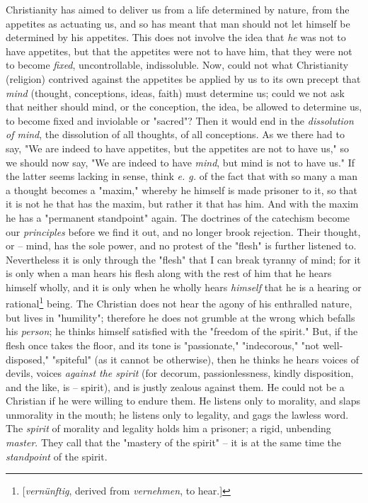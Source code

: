 Christianity has aimed to deliver us from a life determined by nature, from 
the appetites as actuating us, and so has meant that man should not let 
himself be determined by his appetites. This does not involve the idea that 
\textit{he} was not to have appetites, but that the appetites were not to have 
him, that they were not to become \textit{fixed}, uncontrollable, 
indissoluble. Now, could not what Christianity (religion) contrived against 
the appetites be applied by us to its own precept that \textit{mind} (thought, 
conceptions, ideas, faith) must determine us; could we not ask that neither 
should mind, or the conception, the idea, be allowed to determine us, to 
become fixed and inviolable or "{}sacred"{}? Then it would end in the 
\textit{dissolution of mind}, the dissolution of all thoughts, of all 
conceptions. As we there had to say, "{}We are indeed to have appetites, but 
the appetites are not to have us,"{} so we should now say, "{}We are indeed to 
have \textit{mind}, but mind is not to have us."{} If the latter seems lacking 
in sense, think \textit{e. g.} of the fact that with so many a man a thought 
becomes a "{}maxim,"{} whereby he himself is made prisoner to it, so that it 
is not he that has the maxim, but rather it that has him. And with the maxim 
he has a "{}permanent standpoint"{} again. The doctrines of the catechism 
become our \textit{principles} before we find it out, and no longer brook 
rejection. Their thought, or -- mind, has the sole power, and no protest of 
the "{}flesh"{} is further listened to. Nevertheless it is only through the 
"{}flesh"{} that I can break tyranny of mind; for it is only when a man hears 
his flesh along with the rest of him that he hears himself wholly, and it is 
only when he wholly hears \textit{himself} that he is a hearing or 
rational\footnote{[\textit{vern\"unftig}, derived from \textit{vernehmen}, to 
hear.]} being. The Christian does not hear the agony of his enthralled nature, 
but lives in "{}humility"{}; therefore he does not grumble at the wrong which 
befalls his \textit{person}; he thinks himself satisfied with the "{}freedom 
of the spirit."{} But, if the flesh once takes the floor, and its tone is 
"{}passionate,"{} "{}indecorous,"{} "{}not well-disposed,"{} "{}spiteful"{} 
(as it cannot be otherwise), then he thinks he hears voices of devils, voices 
\textit{against the spirit} (for decorum, passionlessness, kindly disposition, 
and the like, is -- spirit), and is justly zealous against them. He could not 
be a Christian if he were willing to endure them. He listens only to morality, 
and slaps unmorality in the mouth; he listens only to legality, and gags the 
lawless word. The \textit{spirit} of morality and legality holds him a 
prisoner; a rigid, unbending \textit{master}. They call that the "{}mastery of 
the spirit"{} -- it is at the same time the \textit{standpoint} of the spirit.

